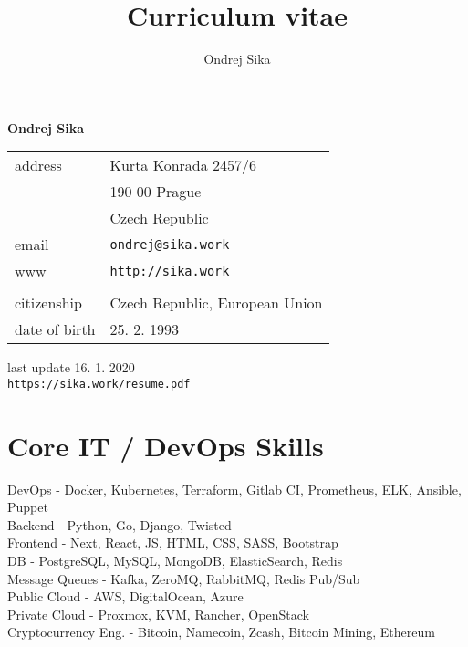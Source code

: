 \documentclass[12pt,a4paper]{article}
\title{Curriculum vitae}
\author{Ondrej Sika}
\begin{document}
\begin{center}
{\LARGE \bf Ondrej Sika}\\
\vspace*{0.2cm}
\begin{tabular}{R{7cm}L{7cm}}
address & Kurta Konrada 2457/6\\
 & 190 00 Prague\\
 & Czech Republic\\
email & \texttt{ondrej@sika.work}\\
www & \texttt{http://sika.work}\\
\\
citizenship & Czech Republic, European Union\\
date of birth & 25. 2. 1993\\
\end{tabular}

\vspace*{0.3cm}
{\hfill last update 16. 1. 2020}\\
{\hfill \texttt{https://sika.work/resume.pdf}}
\end{center}

\section*{Core IT / DevOps Skills}
DevOps - Docker, Kubernetes, Terraform, Gitlab CI, Prometheus, ELK, Ansible, Puppet\\
Backend - Python, Go, Django, Twisted\\
Frontend - Next, React, JS, HTML, CSS, SASS, Bootstrap\\
DB - PostgreSQL, MySQL, MongoDB, ElasticSearch, Redis\\
Message Queues - Kafka, ZeroMQ, RabbitMQ, Redis Pub/Sub\\
Public Cloud - AWS, DigitalOcean, Azure\\
Private Cloud - Proxmox, KVM, Rancher, OpenStack\\
Cryptocurrency Eng. - Bitcoin, Namecoin, Zcash, Bitcoin Mining, Ethereum\\
\end{document}
